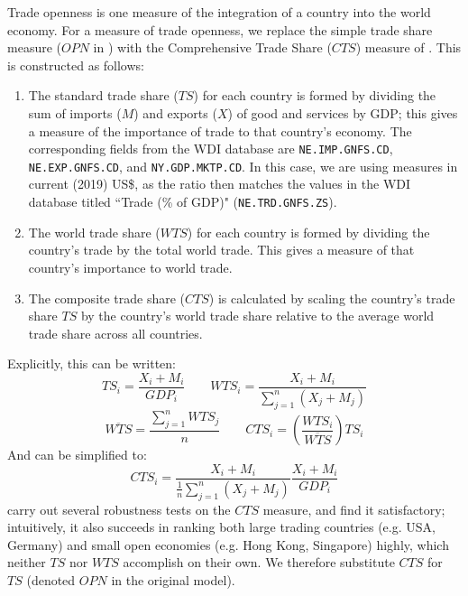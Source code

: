 \documentclass[12pt,a4paper]{article}
\begin{document}
Trade openness is one measure of the integration of a country into the world economy. 
For a measure of trade openness, we replace the simple trade share measure ($OPN$ in \citealt{rafiqUrbanizationOpennessEmissions2016}) with the Comprehensive Trade Share  ($CTS$) measure of \cite{squalliNewMeasureTrade2011}.
This is constructed as follows:
\begin{enumerate}
\item The standard trade share ($TS$) for each country is formed by dividing the sum of imports ($M$) and exports ($X$) of good and services by GDP; this gives a measure of the importance of trade to that country's economy.
The corresponding fields from the WDI database are \texttt{NE.IMP.GNFS.CD}, \texttt{NE.EXP.GNFS.CD}, and \texttt{NY.GDP.MKTP.CD}.
In this case, we are using measures in current (2019) US\$, as the ratio then matches the values in the WDI database titled ``Trade (\% of GDP)" (\texttt{NE.TRD.GNFS.ZS}).
\item The world trade share ($WTS$) for each country is formed by dividing the country's trade by the total world trade. 
This gives a measure of that country's importance to world trade.
\item The composite trade share ($CTS$) is calculated by scaling the country's trade share $TS$ by the country's world trade share relative to the average world trade share across all countries.
\end{enumerate}

Explicitly, this can be written:
\begin{equation*}
TS_i = \frac{X_i + M_i}{GDP_i}
\qquad
WTS_i = \frac{X_i + M_i}{\sum_{j=1}^{n} ( X_j + M_j )}
\end{equation*}
\begin{equation*}
\overline{WTS} = \frac{\sum_{j=1}^{n} WTS_j}{n}
\qquad
CTS_i = \left( \frac{WTS_i}{\overline{WTS}} \right) TS_i
\end{equation*}
And can be simplified to:
\begin{equation}
CTS_i = \frac{X_i + M_i}{\frac{1}{n} \sum_{j=1}^{n} ( X_j + M_j )} \frac{X_i + M_i}{GDP_i}
\end{equation}
\cite{squalliNewMeasureTrade2011} carry out several robustness tests on the $CTS$ measure, and find it satisfactory; intuitively, it also succeeds in ranking both large trading countries (e.g. USA, Germany) and small open economies (e.g. Hong Kong, Singapore) highly, which neither $TS$ nor $WTS$ accomplish on their own.
We therefore substitute $CTS$ for $TS$ (denoted $OPN$ in the original model).
\end{document}
